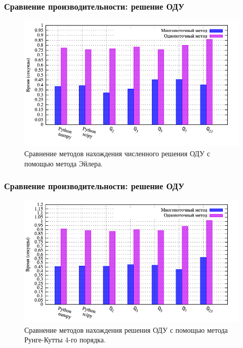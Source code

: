 \documentclass[10pt,professionalfont,utf8,presentation,compress]{beamer}
\theoremstyle{definition}
\theoremstyle{plain}
\begin{document}
\begin{frame}
\frametitle{Сравнение производительности: решение ОДУ}
\begin{figure}[H]
\centerline{\includegraphics[width=0.95\linewidth]{../gnuplot/multi/euler/plot.png}}
\caption{Сравнение методов нахождения численного решения ОДУ с помощью метода Эйлера.}
\label{img:multi:ode:euler}
\end{figure}
\end{frame}


\begin{frame}
\frametitle{Сравнение производительности: решение ОДУ}
\begin{figure}[H]
\centerline{\includegraphics[width=0.95\linewidth]{../gnuplot/multi/rk/plot.png}}
\caption{Сравнение методов нахождения решения ОДУ с помощью метода Рунге-Кутты 4-го порядка.}
\label{img:comp:ode:rk}
\end{figure}
\end{frame}


\end{document}
